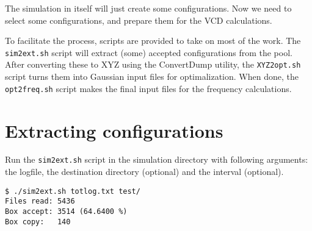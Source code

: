 
The simulation in itself will just create some configurations. Now we need to 
select some configurations, and prepare them for the VCD calculations.

To facilitate the process, scripts are provided to take on most of the work. 
The \verb|sim2ext.sh| script will extract (some) accepted configurations from 
the 
pool. After converting these to XYZ using the ConvertDump utility, the 
\verb|XYZ2opt.sh| script turns them into Gaussian input files for 
optimalization. When done, the \verb|opt2freq.sh| script makes the final input 
files for the frequency calculations.

\section{Extracting configurations}

Run the \verb|sim2ext.sh| script in the simulation directory with following 
arguments: the logfile, the destination directory (optional) and the interval 
(optional).

\begin{lstlisting}[caption=The sim2ext script]
$ ./sim2ext.sh totlog.txt test/
Files read: 5436
Box accept: 3514 (64.6400 %)
Box copy:   140
\end{lstlisting}